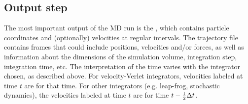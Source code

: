 \documentclass[11pt,a4paper,twoside]{article}
\begin{document}

\subsection{Output step}
The most important output of the MD run is the {\em
{}}, which contains particle coordinates
and (optionally) velocities at regular intervals.
The trajectory file contains frames that could include positions,
velocities and/or forces, as well as information about the dimensions
of the simulation volume, integration step, integration time, etc. The
interpretation of the time varies with the integrator chosen, as
described above. For velocity-Verlet integrators, velocities labeled
at time $t$ are for that time. For other integrators (e.g. leap-frog,
stochastic dynamics), the velocities labeled at time $t$ are for time
$t - \frac{1}{2} {\Delta t}$.


\end{document}
